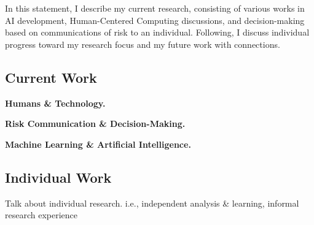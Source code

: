 \documentclass{article}
\begin{document}
\indent In this statement, I describe my current research, consisting of various works in AI development, Human-Centered Computing discussions, 
and decision-making based on communications of risk to an individual. Following, I discuss individual progress toward my research focus and my 
future work with connections. 

\vspace{10pt}
\begin{center}
    \section*{Current Work}
\end{center}

\begin{center}
    \item \textbf{Humans \& Technology.}
\end{center}

\indent \lipsum[1]

\begin{center}
    \item \textbf{Risk Communication \& Decision-Making.}    
\end{center}

\indent \lipsum[1]

\begin{center}
    \item \textbf{Machine Learning \& Artificial Intelligence.}
\end{center}

\indent \lipsum[1]

\vspace{10pt}
\begin{center}
    \item \section*{Individual Work}
\end{center}

Talk about individual research. i.e., independent analysis \& learning, informal research experience
\end{document}
